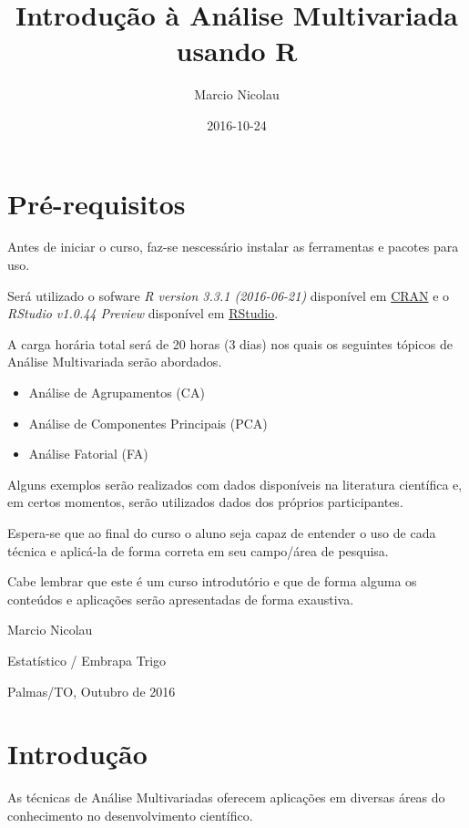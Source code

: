 \documentclass[]{book}
\title{Introdução à Análise Multivariada usando R}
\author{Marcio Nicolau}
\date{2016-10-24}
\providecommand{\tightlist}{%
  \setlength{\itemsep}{0pt}\setlength{\parskip}{0pt}}
\begin{document}
\maketitle

{
\setcounter{tocdepth}{1}
\tableofcontents
}
\chapter{Pré-requisitos}\label{pre-requisitos}

Antes de iniciar o curso, faz-se nescessário instalar as ferramentas e
pacotes para uso.

Será utilizado o sofware \emph{R version 3.3.1 (2016-06-21)} disponível
em \href{https://cran.r-project.org}{CRAN} e o \emph{RStudio v1.0.44
Preview} disponível em
\href{https://www.rstudio.com/products/rstudio/download/preview/}{RStudio}.

A carga horária total será de 20 horas (3 dias) nos quais os seguintes
tópicos de Análise Multivariada serão abordados.

\begin{itemize}
\tightlist
\item
  Análise de Agrupamentos (CA)
\item
  Análise de Componentes Principais (PCA)
\item
  Análise Fatorial (FA)
\end{itemize}

Alguns exemplos serão realizados com dados disponíveis na literatura
científica e, em certos momentos, serão utilizados dados dos próprios
participantes.

Espera-se que ao final do curso o aluno seja capaz de entender o uso de
cada técnica e aplicá-la de forma correta em seu campo/área de pesquisa.

Cabe lembrar que este é um curso introdutório e que de forma alguma os
conteúdos e aplicações serão apresentadas de forma exaustiva.

Marcio Nicolau

Estatístico / Embrapa Trigo

Palmas/TO, Outubro de 2016

\chapter{Introdução}\label{intro}

As técnicas de Análise Multivariadas oferecem aplicações em diversas
áreas do conhecimento no desenvolvimento científico.
\end{document}
